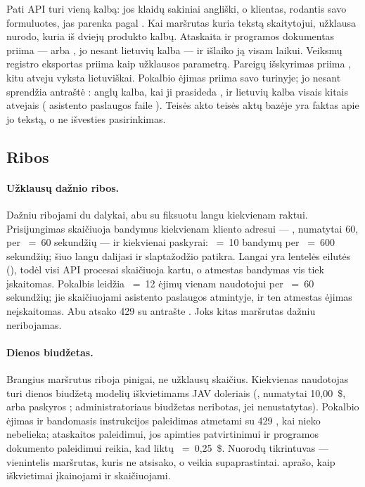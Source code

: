 Pati API turi vieną kalbą: jos klaidų sakiniai angliški, o klientas, rodantis savo formuluotes,
jas parenka pagal . Kai maršrutas kuria tekstą skaitytojui, užklausa nurodo, kuria iš
dviejų produkto kalbų. Ataskaita ir programos dokumentas priima  ---  arba
, jo nesant lietuvių kalba --- ir išlaiko ją visam laikui. Veiksmų registro eksportas
 priima kaip užklausos parametrą. Pareigų išskyrimas priima
, kitu atveju vyksta lietuviškai. Pokalbio ėjimas  priima savo
turinyje; jo nesant sprendžia antraštė : anglų kalba, kai ji prasideda
, ir lietuvių kalba visais kitais atvejais ( asistento paslaugos faile
). Teisės akto  teisės aktų bazėje yra faktas apie jo tekstą,
o ne išvesties pasirinkimas.

\subsection{Ribos}\label{sec:api:limits}

\paragraph{Užklausų dažnio ribos.} Dažniu ribojami du dalykai, abu su fiksuotu langu kiekvienam
raktui. Prisijungimas skaičiuoja bandymus kiekvienam kliento adresui --- ,
numatytai 60, per ~=~60 sekundžių --- ir kiekvienai paskyrai:
~=~10 bandymų per ~=~600 sekundžių; šiuo langu dalijasi ir
 slaptažodžio patikra. Langai yra lentelės
 eilutės (), todėl visi API procesai skaičiuoja
kartu, o atmestas bandymas vis tiek įskaitomas. Pokalbis leidžia ~=~12
ėjimų vienam naudotojui per ~=~60 sekundžių; jie skaičiuojami asistento
paslaugos atmintyje, ir ten atmestas ėjimas neįskaitomas. Abu atsako 429  su
antrašte . Joks kitas maršrutas dažniu neribojamas.

\paragraph{Dienos biudžetas.} Brangius maršrutus riboja pinigai, ne užklausų skaičius. Kiekvienas
naudotojas turi dienos biudžetą modelių iškvietimams JAV doleriais (,
numatytai 10,00~\$, arba paskyros ; administratoriaus biudžetas neribotas,
jei nenustatytas). Pokalbio ėjimas ir bandomasis instrukcijos paleidimas atmetami su 429
, kai nieko nebelieka; ataskaitos paleidimui, jos apimties patvirtinimui ir
programos dokumento paleidimui reikia, kad liktų ~=~0,25~\$.
Nuorodų tikrintuvas --- vienintelis maršrutas, kuris ne atsisako, o veikia supaprastintai.
 aprašo, kaip iškvietimai įkainojami ir skaičiuojami.

